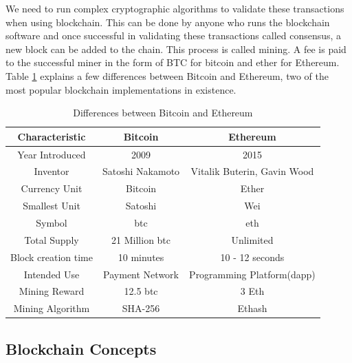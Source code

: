 \documentclass[11pt,openright]{report}
\begin{document}
We need to run complex cryptographic algorithms to validate these transactions when using blockchain. This can be done by anyone who runs the blockchain software and once successful in validating these transactions called consensus, a new block can be added to the chain. This process is called mining. A fee is paid to the successful miner in the form of BTC for bitcoin and ether for Ethereum.
Table \ref{differences_bitcoin_ethereum} explains a few differences between Bitcoin and Ethereum, two of the most popular blockchain implementations in existence.
\newline
\newline
\begin{table}[!htbp]
	\renewcommand{\arraystretch}{1.3}
	\caption{Differences between Bitcoin and Ethereum}
	\label{differences_bitcoin_ethereum}
	\centering
	\begin{tabular}{|c||c|c|}
		\hline
		\bfseries Characteristic & \bfseries Bitcoin & \bfseries Ethereum\\
		\hline\hline
	    Year Introduced & 2009 & 2015\\ \hline
	    Inventor & Satoshi Nakamoto & Vitalik Buterin, Gavin Wood\\ \hline
	    Currency Unit & Bitcoin & Ether\\ \hline
	    Smallest Unit & Satoshi & Wei\\ \hline
	    Symbol & btc & eth \\ \hline
	    Total Supply & 21 Million btc & Unlimited\\ \hline
	    Block creation time & 10 minutes & 10 - 12 seconds\\ \hline
	    Intended Use & Payment Network & Programming Platform(dapp)\\ \hline
	    Mining Reward & 12.5 btc & 3 Eth \\ \hline
        Mining Algorithm & SHA-256 & Ethash \\ \hline
	\end{tabular}
\end{table}
\newline
\newline
\subsection{Blockchain Concepts}
\end{document}

